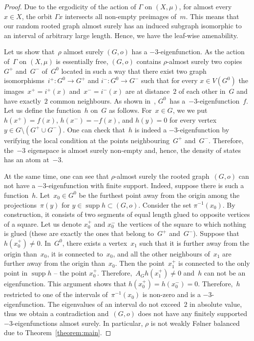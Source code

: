 \documentclass[english]{article}
\theoremstyle{definition}
\DeclareMathOperator{\supp}{supp}%
\begin{document}
\begin{proof}
Due to the ergodicity of the action of $\Gamma$ on $(X, \mu)$,  for almost every~$x \in X$, the orbit $\Gamma x$ intersects all non-empty preimages of~$m$. This means that our random rooted graph almost surely has an induced subgraph isomorphic to an interval of arbitrary large length. Hence, we have the leaf-wise amenability. 

Let us show that~$\rho$ almost surely $(G,o)$ has a $-3$-eigenfunction. As the action of~$\Gamma$ on $(X,\mu)$ is essentially free, $(G,o)$ contains $\rho$-almost surely two copies~$G^+$ and~$G^-$ of~$G^0$ located in such a way that there exist two graph isomorphisms~$i^+ \colon G^0 \to G^+$ and $i^-\colon G^0 \to G^-$ such that for every $x\in V(G^0)$ the images~$x^+ =i^+(x)$ and~$x^- = i^-(x)$ are at distance~$2$ of each other in~$G$ and have exactly~$2$ common neighbours. As shown in~\cite{KK25}, $G^0$~has a~$-3$-eigenfunction~$f$. Let us define the function~$h$ on~$G$ as follows. For~$x \in G$, we we put $h(x^+)= f(x)$, $h(x^-)= -f(x)$, and $h(y) =0$ for every vertex $y \in G\setminus (G^+ \cup G^-)$. One can check that~$h$ is indeed a $-3$-eigenfunction by verifying the local condition at the points neighbouring~$ G^+$ and~$G^-$. Therefore, the~$-3$ eigenspace is almost surely non-empty and, hence, the density of states has an atom at~$-3$.

At the same time, one can see that $\rho$-almost surely the rooted graph~$(G,o)$ can not have a $-3$-eigenfunction with finite support. Indeed, suppose there is such a function~$h$. Let~$x_0 \in G^0$ be the furthest point away from the origin among the projections~$\pi(y)$ for $y \in \supp h \subset (G,o)$. Consider the set $\pi^{-1}(x_0)$. By construction, it consists of two segments of equal length glued to opposite vertices of a square. Let us denote $x_0^+$ and $x_0^-$ the vertices of the square to which nothing is glued (these are exactly the ones that belong to~$G^+$ and~$G^-$). Suppose that~$h(x_0^+)\not= 0$. In~$G^0$, there exists a vertex~$x_1$ such that it is further away from the origin than~$x_0$, it is connected to~$x_0$, and all the other neighbours of~$x_1$ are further away from the origin than~$x_0$. Then the point~$x_1^+$ is connected to the only point in $\supp h$ -- the point $x_0^+$. Therefore,~$A_G h (x_1^+) \not = 0$ and~$h$ can not be an eigenfunction. This argument shows that $h(x_0^+) = h(x_0^-) = 0$. Therefore,~$h$ restricted to one of the intervals of~$\pi^{-1}(x_0)$ is non-zero and is a $-3$-eigenfunction. The eigenvalues of an interval do not exceed~$2$ in absolute value, thus we obtain a contradiction and~$(G,o)$ does not have any finitely supported $-3$-eigenfunctions almost surely. In particular, $\rho$ is not weakly {F\o lner} balanced due to Theorem~\ref{theorem:main}.
\end{proof}
\end{document}
